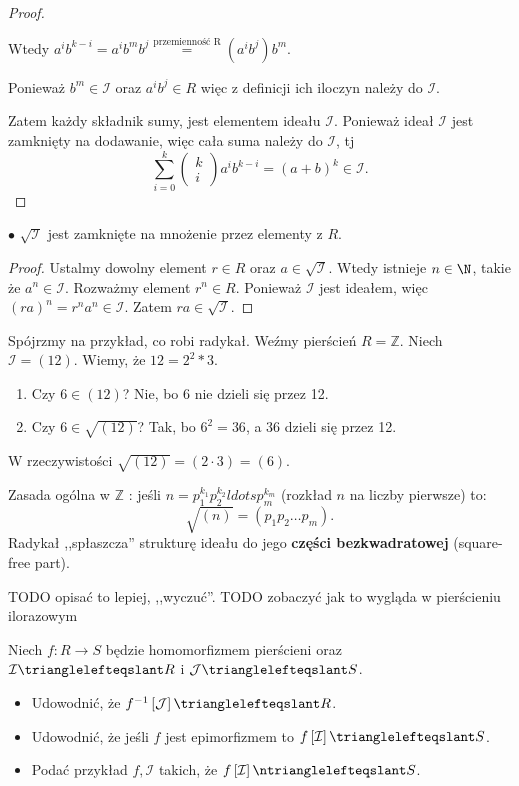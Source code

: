 \begin{solution}
\begin{proof}
\begin{itemize}
					Wtedy $a^{i}b^{k-i} = a^{i}b^{m}b^{j} \overset{\text{przemienność R}}{=} \left( a^{i}b^{j} \right) b^{m}$.

					Ponieważ $b^{m}\in \mathcal{I}$ oraz $a^{i}b^{j} \in R$ więc z definicji ich iloczyn należy do $\mathcal{I}$.
			\end{itemize}
			Zatem każdy składnik sumy, jest elementem ideału $\mathcal{I}$. Ponieważ ideał $\mathcal{I}$ jest zamknięty na dodawanie, więc cała suma należy do $\mathcal{I}$, tj
			\[
			\sum_{i=0}^{k} \begin{pmatrix} k \\ i \end{pmatrix} a^{i}b^{k-i} = \left( a + b \right) ^{k} \in \mathcal{I}
			.\] 
	\end{proof} 
	\noindent $\bullet$ $\sqrt{\mathcal{I}}$ jest zamknięte na mnożenie przez elementy z $R$.
	\begin{proof}
		Ustalmy dowolny element  $r \in R$ oraz $a \in \sqrt{\mathcal{I}} $. Wtedy istnieje $n\in \N$, takie że $a^{n} \in \mathcal{I}$. Rozważmy element $r ^{n} \in R$. Ponieważ $\mathcal{I}$ jest ideałem, więc $\left( ra \right)^{n} = r^{n}a^{n} \in \mathcal{I}$. Zatem $ra \in \sqrt{\mathcal{I}} $.
	\end{proof} 
\end{solution} 
\begin{intuition}
	Spójrzmy na przykład, co robi radykał. Weźmy pierścień $R = \mathbb{Z} $. Niech $\mathcal{I} = \left( 12 \right) $. Wiemy, że $12 = 2^2 * 3$.
	\begin{enumerate}[label=\arabic*)]
		\item Czy $6 \in \left( 12 \right) $? Nie, bo 6 nie dzieli się przez 12.
		\item Czy $6 \in \sqrt{\left( 12 \right) } $? Tak, bo $6^2 = 36$, a 36 dzieli się przez 12.
	\end{enumerate}
	W rzeczywistości $\sqrt{\left( 12 \right) } = \left( 2\cdot 3 \right) = \left( 6 \right) $.

	Zasada ogólna w $\mathbb{Z} $ : jeśli $n=p_1^{k_1}p_2^{k_2}ldots p_{m}^{k_{m}}$ (rozkład $n$ na liczby pierwsze) to:
	\[
	\sqrt{\left( n \right) } = \left( p_1p_2\ldots p_{m} \right)  
	.\] 
	Radykał ,,spłaszcza'' strukturę ideału do jego \textbf{części bezkwadratowej} (square-free part).

	TODO opisać to lepiej, ,,wyczuć''. TODO zobaczyć jak to wygląda w pierścieniu ilorazowym
\end{intuition} 
\begin{problem}[3]
	Niech $f: R \to S$ będzie homomorfizmem pierścieni oraz $\mathcal{I} \trianglelefteqslant R$ i $\mathcal{J} \trianglelefteqslant S$.	
	\begin{itemize}
		\item Udowodnić, że $f^{-1}\left[ \mathcal{J} \right] \trianglelefteqslant  R$.
		\item Udowodnić, że jeśli $f$ jest epimorfizmem to $f\left[ \mathcal{I} \right] \trianglelefteqslant  S$.
		\item Podać przykład $f, \mathcal{I}$ takich, że $f\left[ \mathcal{I} \right] \ntrianglelefteqslant S$.
	\end{itemize}	
\end{problem} 
